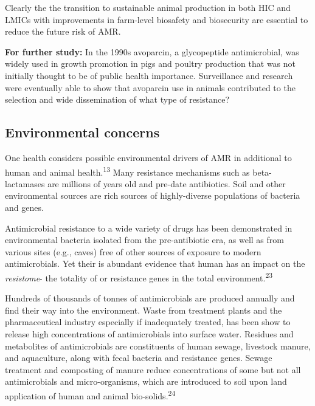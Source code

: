 \documentclass[
]{book}
\begin{document}
Clearly the the transition to sustainable animal production in both HIC and LMICs with improvements in farm-level biosafety and biosecurity are essential to reduce the future risk of AMR.

\textbf{For further study:} In the 1990s avoparcin, a glycopeptide antimicrobial, was widely used in growth promotion in pigs and poultry production that was not initially thought to be of public health importance. Surveillance and research were eventually able to show that avoparcin use in animals contributed to the selection and wide dissemination of what type of resistance?

\hypertarget{environmental-concerns}{%
\subsection*{Environmental concerns}\label{environmental-concerns}}

One health considers possible environmental drivers of AMR in additional to human and animal health.\textsuperscript{13} Many resistance mechanisms such as beta-lactamases are millions of years old and pre-date antibiotics. Soil and other environmental sources are rich sources of highly-diverse populations of bacteria and genes.

Antimicrobial resistance to a wide variety of drugs has been demonstrated in environmental bacteria isolated from the pre-antibiotic era, as well as from various sites (e.g., caves) free of other sources of exposure to modern antimicrobials. Yet their is abundant evidence that human has an impact on the \emph{resistome}- the totality of or resistance genes in the total environment.\textsuperscript{23}

Hundreds of thousands of tonnes of antimicrobials are produced annually and find their way into the environment. Waste from treatment plants and the pharmaceutical industry especially if inadequately treated, has been show to release high concentrations of antimicrobials into surface water. Residues and metabolites of antimicrobials are constituents of human sewage, livestock manure, and aquaculture, along with fecal bacteria and resistance genes. Sewage treatment and composting of manure reduce concentrations of some but not all antimicrobials and micro-organisms, which are introduced to soil upon land application of human and animal bio-solids.\textsuperscript{24}
\end{document}
